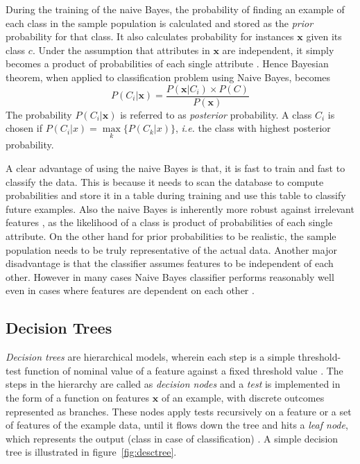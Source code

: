 During the training of the naive Bayes, the probability of finding an example of each class in the sample population is calculated and stored as the \emph{prior} probability for that class. It also calculates probability for instances $\boldsymbol{x}$ given its class $c$. Under the assumption that attributes in $\boldsymbol{x}$ are independent, it simply becomes a product of probabilities of each single attribute \cite{Williams2006}.
Hence Bayesian theorem, when applied to classification problem using Naive Bayes, becomes
\[ P(C_i|\boldsymbol{x}) = \frac{P(\boldsymbol{x}|C_i) \times P(C)}{P(\boldsymbol{x})}\]
The probability $P(C_i|\boldsymbol{x})$ is referred to as \emph{posterior} probability. A class $C_i$ is chosen if $P(C_i|x) = \max\limits_{k} \{ P(C_k|x)\}$, \emph{i.e.} the class with highest posterior probability.

A clear advantage of using the naive Bayes is that, it is fast to train and fast to classify the data. This is because it needs to scan the database to compute probabilities and store it in a table during training and use this table to classify future examples. Also the naive Bayes is inherently more robust against irrelevant features \cite{Kim2008}, as the likelihood of a class is product of probabilities of each single attribute. On the other hand for prior probabilities to be realistic, the sample population needs to be truly representative of the actual data. Another major disadvantage is that the classifier assumes features to be independent of each other. However in many cases Naive Bayes classifier performs reasonably well even in cases where features are dependent on each other \cite{John1995, Williams2006}.

\subsection{Decision Trees}
\emph{Decision trees} are hierarchical models, wherein each step is a simple threshold-test function of nominal value of a feature against a fixed threshold value \cite{Kotsiantis2013}. The steps in the hierarchy are called as \emph{decision nodes} and a \emph{test} is implemented in the form of a function on features $\boldsymbol{x}$ of an example, with discrete outcomes represented as branches. These nodes apply tests recursively on a feature or a set of features of the  example data, until it flows down the tree and hits a \emph{leaf node}, which represents the output (class in case of classification) \cite{Alpaydin2004}. A simple decision tree is illustrated in figure~\ref{fig:desctree}.

